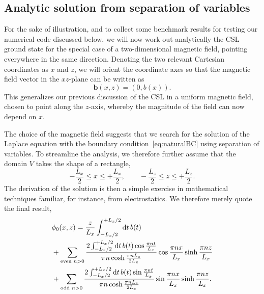 \documentclass[pdflatex,iicol,sn-mathphys-num]{sn-jnl}
\let\p=\phi
\newcommand{\dd}{\text{d}}%
\newcommand{\vek}[1]{\bm{#1}}%
\newcommand{\bmag}{b}%
\providecommand{\DIFaddend}{} %
\begin{document}
\DIFaddend %

\subsection{Analytic solution from separation of variables}
\label{subsec:nonuniformBzeroMseparation}

For the sake of illustration, and to collect some benchmark results for testing our numerical code discussed below, we will now work out analytically the CSL ground state for the special case of a two-dimensional magnetic field, pointing everywhere in the same direction. Denoting the two relevant Cartesian coordinates as $x$ and $z$, we will orient the coordinate axes so that the magnetic field vector in the $xz$-plane can be written as
\begin{equation}
\vek\bmag(x,z)=(0,\bmag(x)).
\label{eq:2d_straightH}
\end{equation}
This generalizes our previous discussion of the CSL in a uniform magnetic field, chosen to point along the $z$-axis, whereby the magnitude of the field can now depend on $x$.

The choice of the magnetic field suggests that we search for the solution of the Laplace equation with the boundary condition~\eqref{eq:naturalBC} using separation of variables. To streamline the analysis, we therefore further assume that the domain $V$ takes the shape of a rectangle,
\begin{equation}
-\frac{L_x}{2}\leq x\leq+\frac{L_x}{2},\qquad
-\frac{L_z}{2}\leq z\leq+\frac{L_z}{2}.
\label{eq:rectangle}
\end{equation}
The derivation of the solution is then a simple exercise in mathematical techniques familiar, for instance, from electrostatics. We therefore merely quote the final result,
\begin{align}
\label{eq:solseparation}
&\p_0(x,z)=\frac{z}{L_x}\int_{-{L_x}/2}^{+{L_x}/2}\dd t\,\bmag(t)\\
\notag
&+\sum_{\text{even }n>0}\frac{2\int_{-{L_x}/2}^{+{L_x}/2}\dd t\,\bmag(t)\cos\frac{\pi nt}{L_x}}{\pi n\cosh\frac{\pi nL_z}{2L_x}}\cos\frac{\pi nx}{L_x}\sinh\frac{\pi nz}{L_x}\\
\notag
&+\sum_{\text{odd }n>0}\frac{2\int_{-{L_x}/2}^{+{L_x}/2}\dd t\,\bmag(t)\sin\frac{\pi nt}{L_x}}{\pi n\cosh\frac{\pi nL_z}{2L_x}}\sin\frac{\pi nx}{L_x}\sinh\frac{\pi nz}{L_x}.
\end{align}
\end{document}

